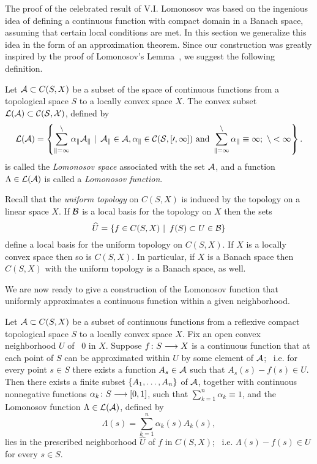 The proof of the celebrated result of V.I. Lomonosov \cite{Lom73,RR73} was
based on the ingenious idea of defining a continuous function with compact
domain in a Banach space, assuming that certain local conditions are met. In
this section we generalize this idea in the form of an approximation theorem.
Since our construction was greatly inspired by the proof of Lomonosov's
Lemma~\cite{Lom73,RR73}, we suggest the following definition.

\begin{defn}
Let ${\cal A} \subset C(S,X)$ be a subset of the space of continuous functions from
a topological space $S$ to a locally convex space $X$. The convex subset
$\cal{L}({\cal A}) \subset C(S,X)$, defined by
\[ \cal{L}({\cal A}) = \left\{ \sum_{k=1}^n \alpha_k A_k \,\,|\,\,\, A_k\in{\cal A},
   \alpha_k\in C(S,[0,1]) \text{ and } \sum_{k=1}^n\alpha_k \equiv 1;
   \,\, n < \infty\right\}. \]
is called the {\em Lomonosov space} associated with the set ${\cal A}$, and a
function $\Lambda \in \cal{L}({\cal A})$ is called a {\em Lomonosov function}.
\end{defn}

\medskip

Recall that the {\em uniform topology} on $C(S,X)$ is induced by the topology
on a linear space $X$. If $\cal{B}$ is a local basis for the topology on $X$
then the sets
\[ \widehat{U}=\left\{f\in C(S,X) \,\,|\,\,\, f(S)\subset U\in\cal{B}\right\} \]
define a local basis for the uniform topology on $C(S,X)$. If $X$ is a
locally convex space then so is $C(S,X)$. In particular, if $X$ is a Banach
space then $C(S,X)$ with the uniform topology is a Banach space, as well.

\medskip

We are now ready to give a construction of the Lomonosov function that
uniformly approximates a continuous function within a given neighborhood.

\smallskip

\begin{lem} \label{l:APPROXI}
Let ${\cal A} \subset C(S,X)$ be a subset of continuous functions from a reflexive
compact topological space $S$ to a locally convex space $X$. Fix an open
convex neighborhood $U$ of \, $0$ in $X$. Suppose $f\colon{}S\longrightarrow{X}$ is a
continuous function that at each point of $S$ can be approximated within $U$
by some element of ${\cal A}$; \, i.e. for every point $s \in S$ there exists a
function $A_s \in{\cal A}$ such that $A_s(s)-f(s)\in{U}$. Then there exists a
finite subset $\left\{A_1,\ldots,A_n\right\}$ of ${\cal A}$, together with continuous
nonnegative functions $\alpha_k\colon{}S\longrightarrow[0,1]$, such that
$\sum_{k=1}^n\alpha_k\equiv1$, and the Lomonosov function
$\Lambda\in\cal{L}({\cal A})$, defined by
\[ \Lambda(s) = \sum_{k=1}^n \alpha_k(s) A_k(s), \]
lies in the prescribed neighborhood $\widehat{U}$ of $f$ in $C(S,X)$; \, i.e.
$\Lambda(s)-f(s)\in{U}$ for every $s\in{S}$.
\end{lem}


